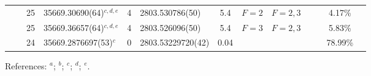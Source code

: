 \begin{table*}
\begin{center}
{\begin{tabular}{:l;l;c;l;c;l;c;l;l;c;c;c;c}
\rowstyle{\itshape}               &        & 25        & 35669.30690(64)$^{c,d,e}$        & 4 &   2803.530786(50)  &  5.4 & $F=2                                     $ & $F=2,3                                   $ & $      $ &              & 4.17\%    & $          $\\
\rowstyle{\itshape}               &        & 25        & 35669.36657(64)$^{c,d,e}$        & 4 &   2803.526096(50)  &  5.4 & $F=3                                     $ & $F=2,3                                   $ & $      $ &              & 5.83\%    & $          $\\
\rowstyle{\itshape}               &        & 24        & 35669.2876697(53)$^{c}$          & 0 & 2803.53229720(42)  & 0.04 & $                                        $ & $                                        $ & $      $ &              & 78.99\%   & $          $\\
\hline
\end{tabular}
}
{\footnotesize References:
$^{a}$\citet{Hannemann:2006:012505};
$^{b}$\citet{Salumbides:2006:L41};
$^{c}$\citet{Batteiger:2009:022503};
$^{d}$\citet{Itano:1981:1364};
$^{e}$\citet{Sur:2005:25}.}
\end{center}
\end{table*}
